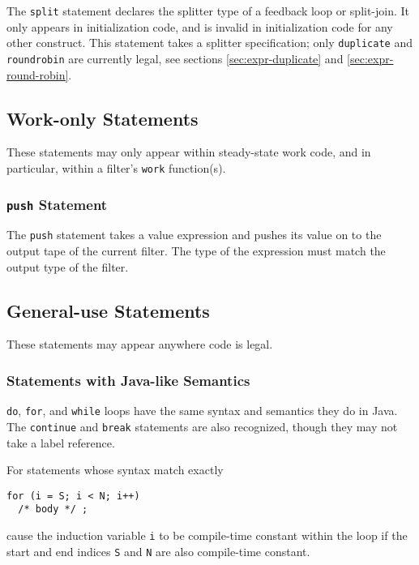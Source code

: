 \documentclass[11pt]{article}
\begin{document}
The \texttt{split} statement declares the splitter type of a feedback
loop or split-join.  It only appears in initialization code, and is
invalid in initialization code for any other construct.  This
statement takes a splitter specification; only \texttt{duplicate} and
\texttt{roundrobin} are currently legal, see sections
\ref{sec:expr-duplicate} and \ref{sec:expr-round-robin}.


\subsection{Work-only Statements}

These statements may only appear within steady-state work code, and in
particular, within a filter's \texttt{work} function(s).

\subsubsection{\texttt{push} Statement}

The \texttt{push} statement takes a value expression and pushes its
value on to the output tape of the current filter.  The type of the
expression must match the output type of the filter.

\subsection{General-use Statements}

These statements may appear anywhere code is legal.

\subsubsection{Statements with Java-like Semantics}

\texttt{do}, \texttt{for}, and \texttt{while} loops have the same
syntax and semantics they do in Java.  The \texttt{continue} and
\texttt{break} statements are also recognized, though they may not
take  a label reference.

For statements whose syntax match exactly

\begin{verbatim}
for (i = S; i < N; i++)
  /* body */ ;
\end{verbatim}

\noindent
cause the induction variable \texttt{i} to be compile-time constant
within the loop if the start and end indices \texttt{S} and \texttt{N} are
also compile-time constant.
\end{document}
